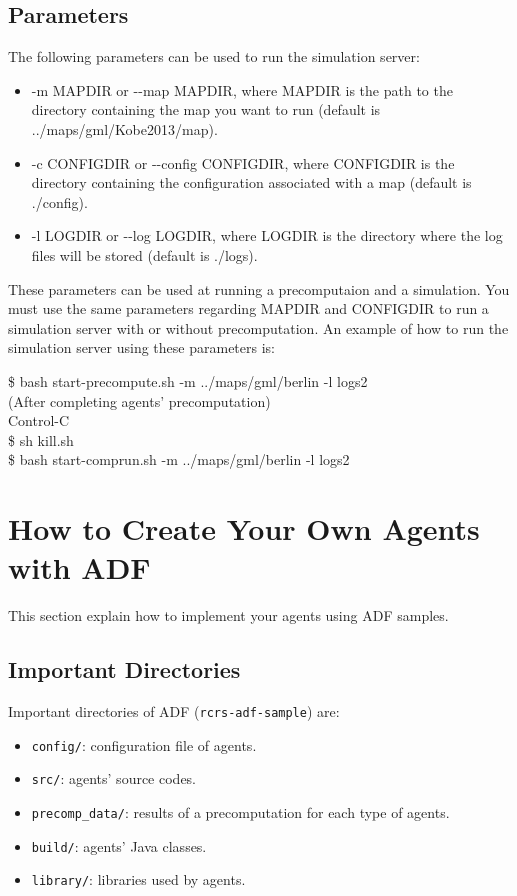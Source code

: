 \documentclass{article}
\begin{document}
\subsection{Parameters}
The following parameters can be used to run the simulation server:
\begin{itemize}
  \item -m MAPDIR or {-}{-}map MAPDIR, where MAPDIR is the path to the directory containing the map you want to run (default is ../maps/gml/Kobe2013/map).
  \item -c CONFIGDIR or {-}{-}config CONFIGDIR, where CONFIGDIR is the directory containing the configuration associated with a map (default is ./config).
  \item -l LOGDIR or {-}{-}log LOGDIR, where LOGDIR is the directory where the log files will be stored (default is ./logs).
\end{itemize}

These parameters can be used at running a precomputaion and a simulation. You must use the same parameters regarding MAPDIR and CONFIGDIR to run a simulation server with or without precomputation. An example of how to run the simulation server using these parameters is:
\begin{center}
   \begin{tcolorbox}[title=Running Simulation Server with Options, width=.98\linewidth]
    {\ttfamily
    \$ bash start-precompute.sh -m ../maps/gml/berlin -l logs2\\
    (After completing agents' precomputation)\\
    Control-C\\
    \$ sh kill.sh\\
    \$ bash start-comprun.sh -m ../maps/gml/berlin -l logs2
    }
  \end{tcolorbox}
\end{center}
\section{How to Create Your Own Agents with ADF}
This section explain how to implement your agents using ADF samples.
\subsection{Important Directories}
Important directories of ADF (\texttt{rcrs-adf-sample}) are:
\begin{itemize}
 \item \texttt{config/}: configuration file of agents.
 \item \texttt{src/}: agents' source codes.
 \item \texttt{precomp\_data/}: results of a precomputation for each type of agents.
 \item \texttt{build/}: agents' Java classes.
 \item \texttt{library/}: libraries used by agents.
\end{itemize}
\end{document}
